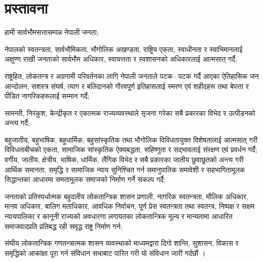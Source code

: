 \section{प्रस्तावना}

हामी सार्वभौमसत्तासम्पन्न नेपाली जनता;

नेपालको स्वतन्त्रता, सार्वभौमिकता, भौगोलिक अखण्डता, राष्ट्रिय एकता, स्वाधीनता र स्वाभिमानलाई अक्षुण्ण राखी जनताको सार्वभौम अधिकार, स्वायत्तता र स्वशासनको अधिकारलाई आत्मसात् गर्दै;

राष्ट्रहित, लोकतन्त्र र अग्रगामी परिवर्तनका लागि नेपाली जनताले पटक– पटक गर्दै आएका ऐतिहासिक जन आन्दोलन, सशस्त्र संघर्ष, त्याग र बलिदानको गौरवपूर्ण इतिहासलाई स्मरण एवं शहीदहरू तथा बेपत्ता र पीडित नागरिकहरूलाई सम्मान गर्दै;

सामन्ती, निरंकुश, केन्द्रीकृत र एकात्मक राज्यव्यवस्थाले सृजना गरेका सबै प्रकारका विभेद र उत्पीडनको अन्त्य गर्दै;

बहुजातीय, बहुभाषिक, बहुधार्मिक, बहुसांस्कृतिक तथा भौगोलिक विविधतायुक्त विशेषतालाई आत्मसात् गरी विविधताबीचको एकता, सामाजिक सांस्कृतिक ऐक्यबद्धता, सहिष्णुता र सद्भावलाई संरक्षण एवं प्रवर्धन गर्दै; वर्गीय, जातीय, क्षेत्रीय, भाषिक, धार्मिक, लैंगिक विभेद र सबै प्रकारका जातीय छुवाछूतको अन्त्य गरी आर्थिक समानता, समृद्धि र सामाजिक न्याय सुनिश्चित गर्न समानुपातिक समावेशी र सहभागितामूलक सिद्धान्तका आधारमा समतामूलक समाजको निर्माण गर्ने संकल्प गर्दै;

जनताको प्रतिस्पर्धात्मक बहुदलीय लोकतान्त्रिक शासन प्रणाली, नागरिक स्वतन्त्रता, मौलिक अधिकार, मानव अधिकार, बालिग मताधिकार, आवधिक निर्वाचन, पूर्ण प्रेस स्वतन्त्रता तथा स्वतन्त्र, निष्पक्ष र सक्षम न्यायपालिका र कानूनी राज्यको अवधारणा लगायतका लोकतान्त्रिक मूल्य र मान्यतामा आधारित समाजवादप्रति प्रतिबद्ध रही समृद्ध राष्ट्र निर्माण गर्न;

संघीय लोकतान्त्रिक गणतन्त्रात्मक शासन व्यवस्थाको माध्यमद्वारा दिगो शान्ति, सुशासन, विकास र समृद्धिको आकांक्षा पूरा गर्न संविधान सभाबाट पारित गरी यो संविधान जारी गर्दछौं ।
